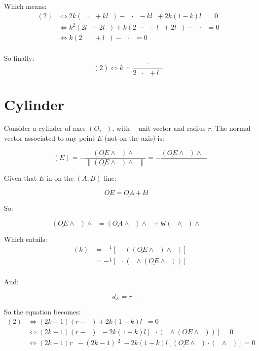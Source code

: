 \documentclass[10pt,a4paper]{article}
\newcommand{\ud}[1]{\underline{#1}}
\DeclareMathOperator{\cross}{\wedge}
\DeclareMathOperator{\CA}{\ud{CA}}
\DeclareMathOperator{\z}{\ud{z}}
\DeclareMathOperator{\e}{\ud{e}}
\DeclareMathOperator{\n}{\ud{n}}
\DeclareMathOperator{\en}{\ud{e}\cdot\ud{n}}
\DeclareMathOperator{\OEz}{\|\ud{OE} \cross \z\|}
\begin{document}
Which means:
$$
\begin{array}{ll}
    (2)
    & \Leftrightarrow
    2k(\CA \cdot \n + kl\en) - \CA \cdot \n - kl \en + 2k(1-k)l\en = 0\\
    & \Leftrightarrow
    k^2(2l\en - 2l\en) + k(2\CA \cdot \n - l\en + 2l\en) - \CA \cdot \n = 0\\
    & \Leftrightarrow
    k(2\CA \cdot \n + l\en) - \CA \cdot \n = 0\\
\end{array}
$$

So finally:
$$
(2) \Leftrightarrow k = \frac{\CA \cdot \n}{2\CA \cdot \n + l\en}
$$

\newpage
\section{Cylinder}

Consider a cylinder of axes $(O, \z)$, with $\z$  unit vector and radius $r$.
The normal vector associated to any point $E$ (not on the axis) is:

$$
\n(E) = - \frac{(\ud{OE} \cross  \z) \cross \z}{
    \|(\ud{OE} \cross  \z) \cross \z\|
}
    = - \frac{(\ud{OE} \cross  \z) \cross \z}{\OEz}
$$

Given that $E$ in on the $(A, B)$ line:

$$
\ud{OE} = \ud{OA} + kl\e
$$

So:

$$
(\ud{OE} \cross \z) \cross \z
= (\ud{OA} \cross \z) \cross \z + kl( \e \cross \z )\cross \z
$$

Which entails:
$$
\begin{array}{ll}
    \en(k)
    & = - \frac{1}{\OEz}\left[ \e \cdot ((\ud{OE}\cross\z) \cross \z)\right]\\
    & = - \frac{1}{\OEz}\left[ \z \cdot (\e \cross (\ud{OE}\cross\z))\right]\\
\end{array}
$$

And:

$$
d_E = r - \OEz
$$

So the equation becomes:
$$
\begin{array}{ll}
    (2)
    & \Leftrightarrow
    (2k-1)(r - \OEz) + 2k(1-k)l\en = 0\\
    & \Leftrightarrow
    (2k-1)(r - \OEz)\OEz
    - 2k(1-k)l\left[ \z \cdot (\e \cross (\ud{OE}\cross\z))\right] = 0\\
    & \Leftrightarrow
    (2k-1)r\OEz - (2k-1)\OEz^2
    - 2k(1-k)l\left[ (\ud{OE}\cross\z) \cdot (\z \cross \e)\right] = 0\\
\end{array}
$$
\end{document}
